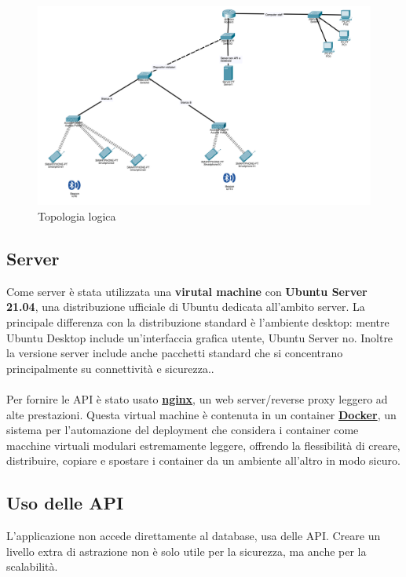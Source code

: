\begin{center}
    \begin{figure}[htp]
        \centering
        \includegraphics[width=\textwidth]{diagrams/network_diagram_v3.png}
        \caption{Topologia logica}
        \label{fig:topologia_logica}
    \end{figure}
\end{center}

\subsection{Server}
Come server è stata utilizzata una \textbf{virutal machine} con \textbf{Ubuntu Server 21.04}, una distribuzione ufficiale di Ubuntu dedicata all'ambito server. La principale differenza con la distribuzione standard è l'ambiente desktop: mentre Ubuntu Desktop include un'interfaccia grafica utente, Ubuntu Server no. Inoltre la versione server include anche pacchetti standard che si concentrano principalmente su connettività e sicurezza.\cite{ubuntu_server_guide}.\\\\Per fornire le API è stato usato \textbf{\href{https://www.nginx.com/}{nginx}}, un web server/reverse proxy leggero ad alte prestazioni. Questa virtual machine è contenuta in un container \textbf{\href{https://www.docker.com/}{Docker}}, un sistema per l'automazione del deployment che considera i container come macchine virtuali modulari estremamente leggere, offrendo la flessibilità di creare, distribuire, copiare e spostare i container da un ambiente all'altro in modo sicuro.\cite{docker_guide}

\clearpage

\subsection{Uso delle API}
L'applicazione non accede direttamente al database, usa delle API. Creare un livello extra di astrazione non è solo utile per la sicurezza, ma anche per la scalabilità. 

